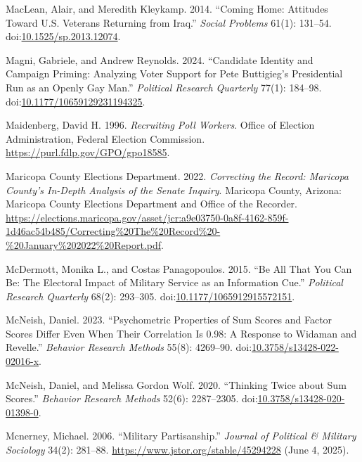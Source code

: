 \documentclass[
  12pt,
  letterpaper,
]{article}
\newlength{\cslhangindent}
\newenvironment{CSLReferences}[2] %
 {\begin{list}{}{%
  \setlength{\itemindent}{0pt}
  \setlength{\leftmargin}{0pt}
  \setlength{\parsep}{0pt}
  \ifodd #1
   \setlength{\leftmargin}{\cslhangindent}
   \setlength{\itemindent}{-1\cslhangindent}
  \fi
  \setlength{\itemsep}{#2\baselineskip}}}
 {\end{list}}
\begin{document}
\begin{CSLReferences}{1}{1}
MacLean, Alair, and Meredith Kleykamp. 2014. {``Coming {Home}:
{Attitudes} Toward {U}.{S}. {Veterans Returning} from {Iraq}.''}
\emph{Social Problems} 61(1): 131--54.
doi:\href{https://doi.org/10.1525/sp.2013.12074}{10.1525/sp.2013.12074}.

Magni, Gabriele, and Andrew Reynolds. 2024. {``Candidate {Identity} and
{Campaign Priming}: {Analyzing Voter Support} for {Pete Buttigieg}'s
{Presidential Run} as an {Openly Gay Man}.''} \emph{Political Research
Quarterly} 77(1): 184--98.
doi:\href{https://doi.org/10.1177/10659129231194325}{10.1177/10659129231194325}.

Maidenberg, David H. 1996. \emph{Recruiting {Poll Workers}}. Office of
Election Administration, Federal Election Commission.
\url{https://purl.fdlp.gov/GPO/gpo18585}.

Maricopa County Elections Department. 2022. \emph{Correcting the
{Record}: {Maricopa County}'s {In-Depth Analysis} of the {Senate
Inquiry}}. Maricopa County, Arizona: {Maricopa County Elections
Department and Office of the Recorder}.
\url{https://elections.maricopa.gov/asset/jcr:a9e03750-0a8f-4162-859f-1d46ac54b485/Correcting\%20The\%20Record\%20-\%20January\%202022\%20Report.pdf}.

McDermott, Monika L., and Costas Panagopoulos. 2015. {``Be {All} That
{You Can Be}: {The Electoral Impact} of {Military Service} as an
{Information Cue}.''} \emph{Political Research Quarterly} 68(2):
293--305.
doi:\href{https://doi.org/10.1177/1065912915572151}{10.1177/1065912915572151}.

McNeish, Daniel. 2023. {``Psychometric Properties of Sum Scores and
Factor Scores Differ Even When Their Correlation Is 0.98: {A} Response
to {Widaman} and {Revelle}.''} \emph{Behavior Research Methods} 55(8):
4269--90.
doi:\href{https://doi.org/10.3758/s13428-022-02016-x}{10.3758/s13428-022-02016-x}.

McNeish, Daniel, and Melissa Gordon Wolf. 2020. {``Thinking Twice about
Sum Scores.''} \emph{Behavior Research Methods} 52(6): 2287--2305.
doi:\href{https://doi.org/10.3758/s13428-020-01398-0}{10.3758/s13428-020-01398-0}.

Mcnerney, Michael. 2006. {``Military {Partisanship}.''} \emph{Journal of
Political \& Military Sociology} 34(2): 281--88.
\url{https://www.jstor.org/stable/45294228} (June 4, 2025).


\end{CSLReferences}
\end{document}
